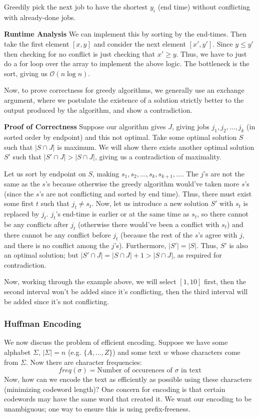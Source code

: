 \begin{algothm}[Scheduling]
    Greedily pick the next job to have the shortest $y_i$ (end time) without conflicting with already-done jobs.

    \textbf{Runtime Analysis} We can implement this by sorting by the end-times. Then take the first element $[x, y]$ and consider the next element $[x', y']$. Since $y \leq y'$
    then checking for no conflict is just checking that $x' \geq y$. Thus, we have to just do a for loop over the array to implement the above logic. The bottleneck is the sort,
    giving us $\mathcal{O}(n \log n)$.

    Now, to prove correctness for greedy algorithms, we generally use an exchange argument, where we postulate the existence of a solution strictly better
    to the output produced by the algorithm, and
    show a contradiction.

    \textbf{Proof of Correctness} Suppose our algorithm gives $J$, giving jobs $j_1, j_2, \dots, j_k$ (in sorted order by endpoint) and this not optimal. Take some optimal solution $S$ such that $|S \cap J|$
    is maximum. We will show there exists another optimal solution $S'$ such that $|S' \cap J| > |S \cap J|$, giving us a contradiction of maximality.

    Let us sort by endpoint on $S$, making $s_1, s_2, \dots, s_k, s_{k + 1}, \dots$. The $j$'s are not the same as the $s$'s because otherwise the greedy algorithm would've taken more $s$'s (since the $s$'s are not conflicting and 
    sorted by end time). Thus, there must exist some first $t$ such that $j_t \neq s_t$. Now, let us introduce a new solution $S'$ with $s_t$ is replaced by $j_t$. $j_t$'s end-time
    is earlier or at the same time as $s_t$, so there cannot be any conflicts after $j_t$ (otherwise there would've been a conflict with $s_t$) and there cannot be any conflict before $j_t$ (because the rest of the $s$'s agree with $j$,
    and there is no conflict among the $j$'s). Furthermore, $|S'| = |S|$. Thus, $S'$ is also an optimal solution; but $|S' \cap J| = |S \cap J| + 1 > |S \cap J|$, as required for contradiction.
\end{algothm}

Now, working through the example above, we will select $[1, 10]$ first, then the second interval won't be added since it's conflicting, then the third interval will be added since it's not conflicting.

\subsubsection{Huffman Encoding}
We now discuss the problem of efficient encoding. Suppose we have some alphabet $\Sigma$, $|\Sigma| = n$ (e.g. $\{A, \dots, Z\}$) and some text $w$ whose characters come
from $\Sigma$. Now there are character frequencies:
\[ freq(\sigma) = \text{Number of occurences of $\sigma$ in text} \]
Now, how can we encode the text as efficiently as possible using these characters (minimizing codeword length)?
One concern for encoding is that certain codewords may have the same word that created it. We want our encoding to be unambiguous; one way to ensure this
is using prefix-freeness.

